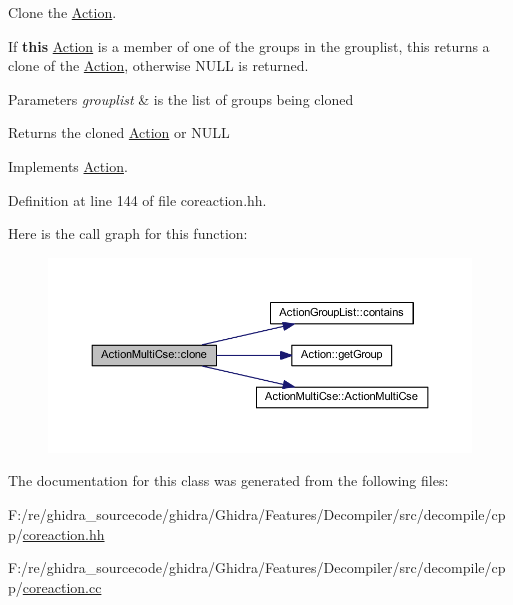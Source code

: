 Clone the \mbox{\hyperlink{class_action}{Action}}. 

If {\bfseries{this}} \mbox{\hyperlink{class_action}{Action}} is a member of one of the groups in the grouplist, this returns a clone of the \mbox{\hyperlink{class_action}{Action}}, otherwise N\+U\+LL is returned. 
\begin{DoxyParams}{Parameters}
{\em grouplist} & is the list of groups being cloned \\
\hline
\end{DoxyParams}
\begin{DoxyReturn}{Returns}
the cloned \mbox{\hyperlink{class_action}{Action}} or N\+U\+LL 
\end{DoxyReturn}


Implements \mbox{\hyperlink{class_action_af8242e41d09e5df52f97df9e65cc626f}{Action}}.



Definition at line 144 of file coreaction.\+hh.

Here is the call graph for this function\+:
\nopagebreak
\begin{figure}[H]
\begin{center}
\leavevmode
\includegraphics[width=350pt]{class_action_multi_cse_a553b599fdf59ccb9c193740e7aabfc80_cgraph}
\end{center}
\end{figure}


The documentation for this class was generated from the following files\+:\begin{DoxyCompactItemize}
\item 
F\+:/re/ghidra\+\_\+sourcecode/ghidra/\+Ghidra/\+Features/\+Decompiler/src/decompile/cpp/\mbox{\hyperlink{coreaction_8hh}{coreaction.\+hh}}\item 
F\+:/re/ghidra\+\_\+sourcecode/ghidra/\+Ghidra/\+Features/\+Decompiler/src/decompile/cpp/\mbox{\hyperlink{coreaction_8cc}{coreaction.\+cc}}\end{DoxyCompactItemize}
